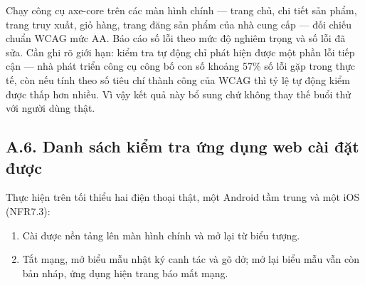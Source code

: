 Chạy công cụ axe-core trên các màn hình chính --- trang chủ, chi tiết sản phẩm,
trang truy xuất, giỏ hàng, trang đăng sản phẩm của nhà cung cấp --- đối chiếu
chuẩn WCAG mức AA. Báo cáo số lỗi theo mức độ nghiêm trọng và số lỗi đã sửa.
Cần ghi rõ giới hạn: kiểm tra tự động chỉ phát hiện được một phần lỗi tiếp
cận --- nhà phát triển công cụ công bố con số khoảng 57\% số lỗi gặp trong thực
tế, còn nếu tính theo số tiêu chí thành công của WCAG thì tỷ lệ tự động kiểm
được thấp hơn nhiều. Vì vậy kết quả này bổ sung chứ không thay thế buổi thử với
người dùng thật.

\subsection*{A.6. Danh sách kiểm tra ứng dụng web cài đặt được}

Thực hiện trên tối thiểu hai điện thoại thật, một Android tầm trung và một iOS
(NFR7.3):
\begin{enumerate}
    \item Cài được nền tảng lên màn hình chính và mở lại từ biểu tượng.
    \item Tắt mạng, mở biểu mẫu nhật ký canh tác và gõ dở; mở lại biểu mẫu vẫn còn
    bản nháp, ứng dụng hiện trang báo mất mạng.
\end{enumerate}
